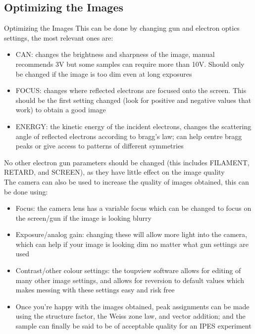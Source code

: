 \documentclass[11pt]{beamer}
\begin{document}
\subsection{Optimizing the Images}
\begin{frame}{Optimizing the Images}
    This can be done by changing gun and electron optics settings, the most relevant ones are:
    \begin{itemize}
        \item CAN: changes the brightness and sharpness of the image, manual recommends 3V but some samples can require more than 10V. Should only be changed if the image is too dim even at long exposures
        \item FOCUS: changes where reflected electrons are focused onto the screen. This should be the first setting changed (look for positive and negative values that work) to obtain a good image
    \end{itemize}
\end{frame}

\begin{frame}
    \begin{itemize}
        \item ENERGY: the kinetic energy of the incident electrons, changes the scattering angle of reflected electrons according to bragg's law; can help centre bragg peaks or give access to patterns of different 
        symmetries
    \end{itemize}
    No other electron gun parameters should be changed (this includes FILAMENT, RETARD, and SCREEN), as they have little effect on the image quality\\
    The camera can also be used to increase the quality of images obtained, this can be done using:
        \begin{itemize}
            \item Focus: the camera lens has a variable focus which can be changed to focus on the screen/gun if the image is looking blurry
        \end{itemize}
\end{frame}

\begin{frame}
    \begin{itemize}
        \item Exposure/analog gain: changing these will allow more light into the camera, which can help if your image is looking dim no matter what gun settings are used
        \item Contrast/other colour settings: the toupview software allows for editing of many other image settings, and allows for reversion to default values which makes messing with these settings easy and risk free
        \item Once you're happy with the images obtained, peak assignments can be made using the structure factor, the Weiss zone law, and vector addition; and the sample can finally be said to be of acceptable quality 
        for an IPES experiment
    \end{itemize}
\end{frame}
\end{document}
